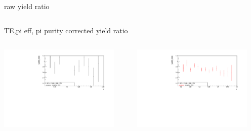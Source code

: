 \begin{frame}{raw yield ratio}
\begin{columns}
\begin{column}[T]{0.5\textwidth}
\end{column}
\begin{column}[T]{0.5\textwidth}
\end{column}
\end{columns}
\end{frame}
\begin{frame}{TE,pi eff, pi purity corrected yield ratio}
\begin{columns}
\begin{column}[T]{0.5\textwidth}
\includegraphics[width = 0.9\textwidth]{results/yield/statistics_corr/x_Q2_z_0.40_4.000_0.50_ratio.pdf}
\end{column}
\begin{column}[T]{0.5\textwidth}
\includegraphics[width = 0.9\textwidth]{results/yield/statistics_corr/x_Q2_z_0.40_4.000_0.60_ratio.pdf}
\end{column}
\end{columns}
\begin{columns}

\end{columns}
\end{frame}
